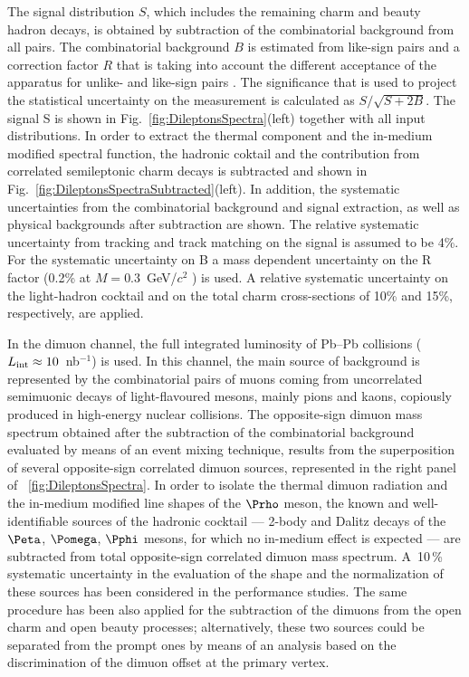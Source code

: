 \documentclass[../report.tex]{subfiles}
\begin{document}
The signal distribution $S$, which includes the remaining charm and beauty hadron decays, is obtained by subtraction of the combinatorial background from all \Pepem pairs. The combinatorial background $B$ is estimated from like-sign pairs and a correction factor $R$ that is taking into account the different acceptance of the apparatus for unlike- and like-sign pairs \cite{Acharya:2018kkj,Acharya:2018ohw,Acharya:2018nxm}. The significance that is used to project the statistical uncertainty on the measurement is calculated as $S/\sqrt{S+2B}$. The signal S is shown in Fig.~\ref{fig:DileptonsSpectra}(left) together with all input distributions. In order to extract the thermal component and the in-medium modified \Prho spectral function, the hadronic coktail and the contribution from correlated semileptonic charm decays is subtracted and shown in Fig.~\ref{fig:DileptonsSpectraSubtracted}(left). In addition, the systematic uncertainties from the combinatorial background and signal extraction, as well as physical backgrounds after subtraction are shown. The relative systematic uncertainty from tracking and track matching on the signal is assumed to be 4\%. For the systematic uncertainty on B a mass dependent uncertainty on the R factor (0.2\% at $M=0.3$~GeV/$c^2$ \cite{Acharya:2018kkj}) is used. A relative systematic uncertainty on the light-hadron cocktail and on the total charm cross-sections of 10\% and 15\%, respectively, are applied.

In the dimuon channel, the full integrated luminosity of Pb--Pb collisions ($L_{\rm int}\approx 10$~nb$^{−1}$) is used. In this channel, the main source of background is represented by the combinatorial pairs of muons coming from uncorrelated semimuonic decays of light-flavoured mesons, mainly pions and kaons, copiously produced in high-energy nuclear collisions. The opposite-sign dimuon mass spectrum obtained after the subtraction of the combinatorial background evaluated by means of an event mixing technique, results from the superposition of several opposite-sign correlated dimuon sources, represented in the right panel of \figurename~\ref{fig:DileptonsSpectra}. In order to isolate the thermal dimuon radiation and the in-medium modified line shapes of the $\Prho$ meson, the known and well-identifiable sources of the hadronic cocktail --- 2-body and Dalitz decays of the $\Peta$, $\Pomega$, $\Pphi$ mesons, for which no in-medium effect is expected --- are subtracted from total opposite-sign correlated dimuon mass spectrum. A~10\,\% systematic uncertainty in the evaluation of the shape and the normalization of these sources has been considered in the performance studies. The same procedure has been also applied for the subtraction of the dimuons from the open charm and open beauty processes; alternatively, these two sources could be separated from the prompt ones by means of an analysis based on the discrimination of the dimuon offset at the primary vertex.
\end{document}
